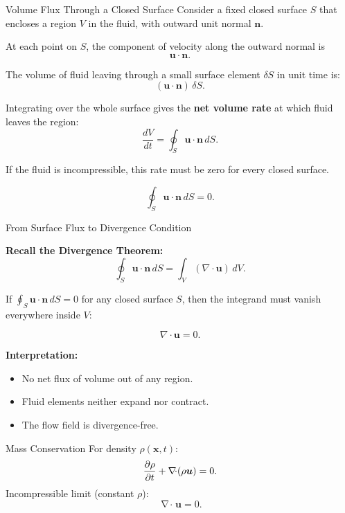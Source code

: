 \documentclass[aspectratio=169]{beamer}
\newcommand{\uu}{\bm{u}}
\newcommand{\x}{\bm{x}}
\DeclareMathOperator{\divg}{\nabla\!\cdot}
\begin{document}
\begin{frame}{Volume Flux Through a Closed Surface}
\small
Consider a fixed closed surface $S$ that encloses a region $V$ in the fluid,
with outward unit normal $\bm{n}$.

\vspace{0.4cm}

At each point on $S$, the component of velocity along the outward normal is
\[
\bm{u}\cdot\bm{n}.
\]

The volume of fluid leaving through a small surface element $\delta S$
in unit time is:
\[
(\bm{u}\cdot\bm{n})\,\delta S.
\]

\vspace{0.4cm}

Integrating over the whole surface gives the \textbf{net volume rate}
at which fluid leaves the region:
\[
\boxed{\frac{dV}{dt} = \oint_S \bm{u}\cdot\bm{n}\, dS.}
\]

If the fluid is incompressible, this rate must be zero for every closed surface.

\[
\boxed{\oint_S \bm{u}\cdot\bm{n}\, dS = 0.}
\]

\end{frame}

\begin{frame}{From Surface Flux to Divergence Condition}

\textbf{Recall the Divergence Theorem:}
\[
\boxed{
\oint_S \bm{u}\cdot\bm{n}\, dS
= \int_V (\nabla\cdot\bm{u})\, dV.
}
\]


If $\displaystyle \oint_S \bm{u}\cdot\bm{n}\, dS = 0$ for any closed surface $S$,
then the integrand must vanish everywhere inside $V$:

\[
\boxed{\nabla\cdot\bm{u} = 0.}
\]

\textbf{Interpretation:}
\begin{itemize}
  \item No net flux of volume out of any region.
  \item Fluid elements neither expand nor contract.
  \item The flow field is divergence-free.
\end{itemize}

\end{frame}


\begin{frame}{Mass Conservation}
For density $\rho(\x,t)$:
\[
\pdv{\rho}{t} + \divg(\rho \uu) = 0.
\]
Incompressible limit (constant $\rho$):
\[
\divg \uu = 0.
\]
\end{frame}
\end{document}
